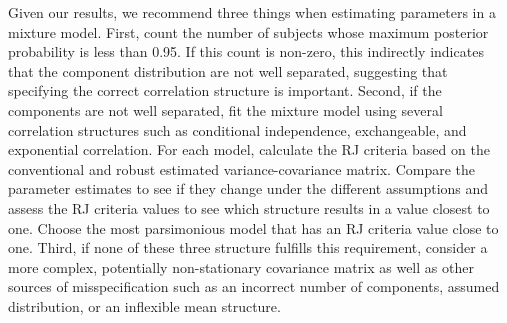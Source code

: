 \documentclass[10pt]{article}
\begin{document}
Given our results, we recommend three things when estimating parameters in a mixture model. First, count the number of subjects whose maximum posterior probability is less than 0.95. If this count is non-zero, this indirectly indicates that the component distribution are not well separated, suggesting that specifying the correct correlation structure is important. Second, if the components are not well separated, fit the mixture model using several correlation structures such as conditional independence, exchangeable, and exponential correlation. For each model, calculate the RJ criteria based on the conventional and robust estimated variance-covariance matrix.  Compare the parameter estimates to see if they change under the different assumptions and assess the RJ criteria values to see which structure results in a value closest to one. Choose the most parsimonious model that has an RJ criteria value close to one.  Third, if none of these three structure fulfills this requirement, consider a more complex, potentially non-stationary covariance matrix as well as other sources of misspecification such as an incorrect number of components, assumed distribution, or an inflexible mean structure.\\
\end{document}

